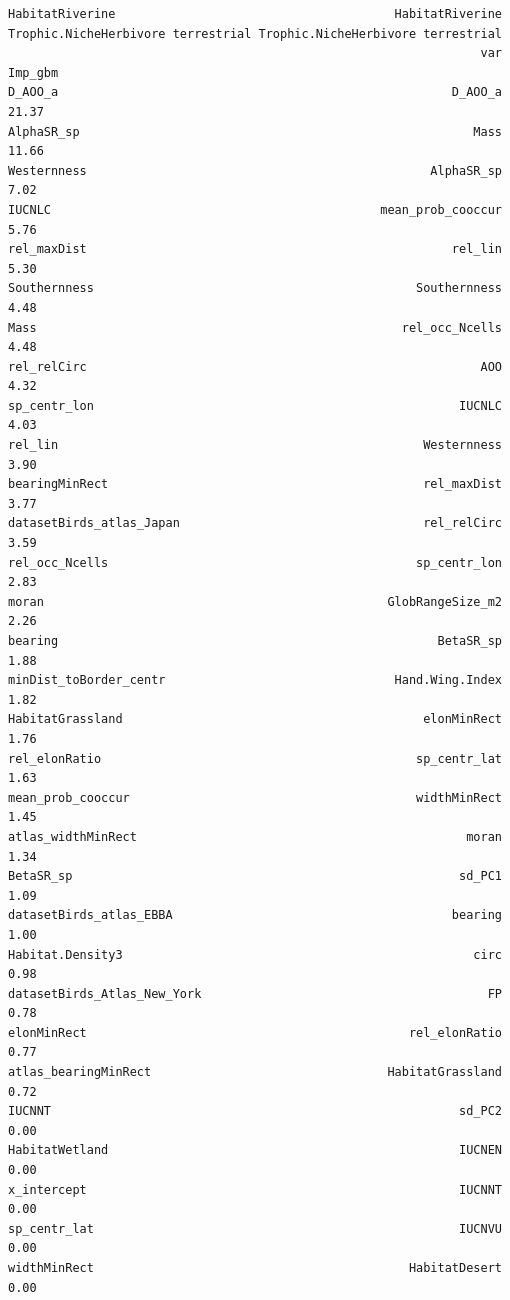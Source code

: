 \documentclass[
  letterpaper,
  DIV=11,
  numbers=noendperiod]{scrreprt}
\begin{document}
\begin{verbatim}
HabitatRiverine                                       HabitatRiverine
Trophic.NicheHerbivore terrestrial Trophic.NicheHerbivore terrestrial
                                                                  var Imp_gbm
D_AOO_a                                                       D_AOO_a   21.37
AlphaSR_sp                                                       Mass   11.66
Westernness                                                AlphaSR_sp    7.02
IUCNLC                                              mean_prob_cooccur    5.76
rel_maxDist                                                   rel_lin    5.30
Southernness                                             Southernness    4.48
Mass                                                   rel_occ_Ncells    4.48
rel_relCirc                                                       AOO    4.32
sp_centr_lon                                                   IUCNLC    4.03
rel_lin                                                   Westernness    3.90
bearingMinRect                                            rel_maxDist    3.77
datasetBirds_atlas_Japan                                  rel_relCirc    3.59
rel_occ_Ncells                                           sp_centr_lon    2.83
moran                                                GlobRangeSize_m2    2.26
bearing                                                     BetaSR_sp    1.88
minDist_toBorder_centr                                Hand.Wing.Index    1.82
HabitatGrassland                                          elonMinRect    1.76
rel_elonRatio                                            sp_centr_lat    1.63
mean_prob_cooccur                                        widthMinRect    1.45
atlas_widthMinRect                                              moran    1.34
BetaSR_sp                                                      sd_PC1    1.09
datasetBirds_atlas_EBBA                                       bearing    1.00
Habitat.Density3                                                 circ    0.98
datasetBirds_Atlas_New_York                                        FP    0.78
elonMinRect                                             rel_elonRatio    0.77
atlas_bearingMinRect                                 HabitatGrassland    0.72
IUCNNT                                                         sd_PC2    0.00
HabitatWetland                                                 IUCNEN    0.00
x_intercept                                                    IUCNNT    0.00
sp_centr_lat                                                   IUCNVU    0.00
widthMinRect                                            HabitatDesert    0.00

\end{verbatim}
\end{document}
